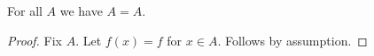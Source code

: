 \begin{proposition}\label{phase5_local_function_failure}
    For all $A$ we have $A = A$.
\end{proposition}
\begin{proof}
    Fix $A$.
    Let $f(x) = f$ for $x\in A$.
    Follows by assumption.
\end{proof}
